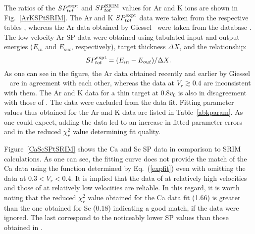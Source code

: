 \documentclass[aps,pra,twocolumn,amsmath,amssymb,floatfix]{revtex4-2}
\begin{document}
The ratios of the $SP_{tot}^{\rm expt}$ and $SP_{tot}^{\rm SRIM}$ values for Ar and K ions are shown in Fig.~\ref{ArKSPtSRIM}. The Ar and K $SP_{tot}^{\rm expt}$ data were taken from the respective tables \cite{Fastrup66,Lennard86,Pape78,Trzaska18,Sharma99}, whereas the Ar data obtained by Giessel \ea\ were taken from the database \cite{IAEASP}. The low velocity Ar SP data \cite{SchulzBrandt82} were obtained using tabulated input and output energies ($E_{in}$ and $E_{out}$, respectively), target thickness $\Delta X$, and the relationship:
\begin{equation}
  SP_{tot}^{\rm expt} = (E_{in} - E_{out}) / \Delta X.                                                                                 \label{dEdX}
\end{equation}
As one can see in the figure, the Ar data obtained recently \cite{Trzaska18} and earlier by Giessel \ea\ \cite{IAEASP} are in agreement with each other, whereas the data \cite{Pape78} at $V_{r} \gtrsim 0.4$ are inconsistent with them.  The  Ar and K data \cite{Lennard86} for a thin target at $0.8 v_{0}$ is also in disagreement with those of \cite{Fastrup66,SchulzBrandt82}. The data \cite{Lennard86,Pape78} were excluded from the data fit. Fitting parameter values thus obtained for the Ar and K data are listed in Table~\ref{abkparam}. As one could expect, adding the data \cite{Lennard86,Pape78} led to an increase in fitted parameter errors and in the reduced $\chi^{2}_{r}$ value determining fit quality.

Figure~\ref{CaScSPtSRIM} shows the Ca and Sc SP data \cite{Fastrup66,Trzaska18,Sharma99,Perkowski06,ShyKum96} in comparison to SRIM calculations. As one can see, the fitting curve does not provide the match of the Ca data \cite{Fastrup66,Trzaska18,Perkowski06} using the function determined by Eq.~(\ref{expfit}) even with omitting the data \cite{Sharma99} at $0.3 < V_{r} < 0.4$. It is implied that the data of \cite{Fastrup66} at relatively high velocities and those of \cite{Perkowski06} at relatively low velocities are reliable. In this regard, it is worth noting that the reduced $\chi^{2}_{r}$ value obtained for the Ca data fit (1.66) is greater than the one obtained for Sc (0.18) indicating a good match, if the data \cite{Lennard86} were ignored. The last correspond to the noticeably lower SP values than those obtained in \cite{Fastrup66}.
\end{document}
